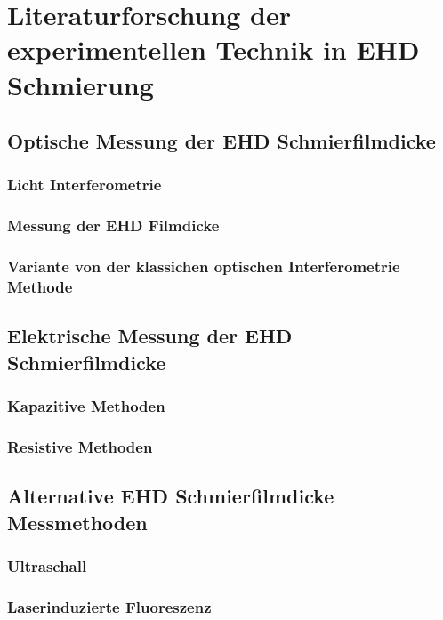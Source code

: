 \chapter{Literaturforschung der experimentellen Technik in EHD Schmierung}
\label{chap:literaturforschung_der_experimentellen_technik_in_ehd_schmierung}
\section{Optische Messung der EHD Schmierfilmdicke}
\label{sec:optische_messung_der_ehd_schmierfilmdicke}

\subsection{Licht Interferometrie}
\label{ssec:licht_interferometrie}

\subsection{Messung der EHD Filmdicke}
\label{ssec:messung_der_ehd_filmdicke}

\subsection{Variante von der klassichen optischen Interferometrie Methode}
\label{ssec:variante_interferometrie}

\section{Elektrische Messung der EHD Schmierfilmdicke}
\label{sec:elektrische_messung_der_ehd_schmierfilmdicke}

\subsection{Kapazitive Methoden}
\label{ssec:kapazitive_methoden}

\subsection{Resistive Methoden}
\label{ssec:resistive_methoden}

\section{Alternative EHD Schmierfilmdicke Messmethoden}
\label{sec:alternative_messmethoden}

\subsection{Ultraschall}
\label{ssec:ultraschall}

\subsection{Laserinduzierte Fluoreszenz}
\label{ssec:laserinduzierte_fluoreszenz}

